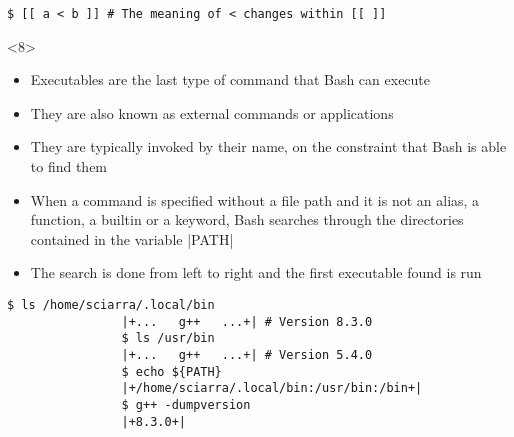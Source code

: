\begin{frame}
\begin{overlayarea}{\textwidth}{0.7\textheight}
\begin{onlyenv}
\begin{lstlisting}[style=MyBash]
                $ [[ a < b ]] # The meaning of < changes within [[ ]]
            \end{lstlisting}
        \end{onlyenv}
        \begin{onlyenv}<8>
            \begin{itemize}
                \item Executables are the last type of command that Bash can execute
                \item They are also known as external commands or applications
                \item They are typically invoked by their name, on the constraint that Bash is able to find them
                \item When a command is specified without a file path and it is \alert{not an alias, a function, a builtin or a keyword}, Bash searches through the directories contained in the variable \bash|PATH|
                \item The search is done from left to right and the first executable found is run
            \end{itemize}
            \begin{lstlisting}[style=MyBash]
                $ ls /home/sciarra/.local/bin
                |+...   g++   ...+| # Version 8.3.0
                $ ls /usr/bin
                |+...   g++   ...+| # Version 5.4.0
                $ echo ${PATH}
                |+/home/sciarra/.local/bin:/usr/bin:/bin+|
                $ g++ -dumpversion
                |+8.3.0+|
            \end{lstlisting}
        \end{onlyenv}
    \end{overlayarea}
\end{frame}
